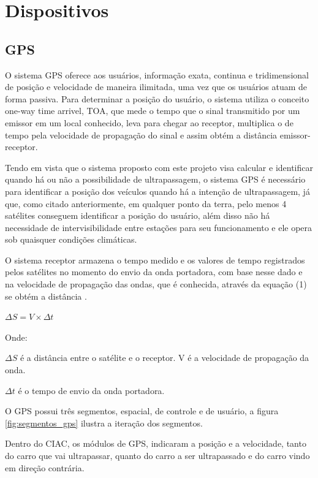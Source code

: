 \chapter{Dispositivos}

\section{GPS}

O sistema GPS oferece aos usuários, informação exata, continua e tridimensional de posição e velocidade de maneira ilimitada, uma vez que os usuários atuam de forma passiva. Para determinar a posição do usuário, o sistema utiliza o conceito one-way time arrivel, TOA, que mede o tempo que o sinal transmitido por um emissor em um local conhecido, leva para chegar ao receptor, multiplica o de tempo pela velocidade de propagação do sinal e assim obtém a distância emissor-receptor. 

Tendo em vista que o sistema proposto com este projeto visa calcular e identificar quando há ou não a possibilidade de ultrapassagem, o sistema GPS é necessário para identificar a posição dos veículos quando há a intenção de ultrapassagem, já que, como citado anteriormente, em qualquer ponto da terra, pelo menos 4 satélites conseguem identificar a posição do usuário, além disso não há necessidade de intervisibilidade entre estações para seu funcionamento e ele opera sob quaisquer condições climáticas.

O sistema receptor armazena o tempo medido e os valores de tempo registrados pelos satélites no momento do envio da onda portadora, com base nesse dado e na velocidade de propagação das ondas, que é conhecida, através da equação (1) se obtém a distância \cite{8gps}.

 $ \Delta S = V \times  \Delta t $

 Onde:

 $ \Delta S $ é a distância entre o satélite e o receptor.
V é a velocidade de propagação da onda.

$ \Delta t $ é o tempo de envio da onda portadora.

O GPS possui três segmentos, espacial, de controle e de usuário, a figura \ref{fig:segmentos_gps} ilustra a iteração dos segmentos.

Dentro do CIAC, os módulos de GPS, indicaram a posição e a velocidade, tanto do carro que vai ultrapassar, quanto do carro a ser ultrapassado e do carro vindo em direção contrária.


